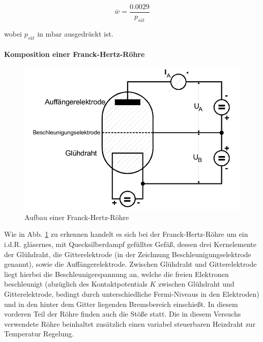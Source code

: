 \begin{equation}
  \label{eqn:Weg}
  \overline{w} = \frac{0.0029}{p_{sät}}
\end{equation}

wobei $p_{sät}$ in $\si{\milli \bar}$ ausgedrückt ist.

\paragraph{Komposition einer Franck-Hertz-Röhre}
\begin{figure}
  \center
  \includegraphics[width=\textwidth]{./logos/roehre.png}
  \caption{Aufbau einer Franck-Hertz-Röhre \cite{Anleitung}}
  \label{fig:roehre}
\end{figure}

Wie in Abb. \ref{fig:roehre} zu erkennen handelt es sich bei der Franck-Hertz-Röhre um ein i.d.R. gläsernes, mit Quecksilberdampf gefülltes Gefäß, dessen drei Kernelemente der Glühdraht, die Gitterelektrode (in der Zeichnung Beschleunigungselektrode genannt), sowie die Auffängerelektrode. Zwischen Glühdraht und Gitterelektrode liegt hierbei die Beschleunigerspannung an, welche die freien Elektronen beschleunigt (abzüglich des Kontaktpotentials $K$ zwischen Glühdraht und Gitterelektrode, bedingt durch unterschiedliche Fermi-Niveaus in den Elektroden) und in den hinter dem Gitter liegenden Bremsbereich einschießt. In diesem vorderen Teil der Röhre finden auch die Stöße statt. Die in diesem Versuchs verwendete Röhre beinhaltet zusätzlich einen variabel steuerbaren Heizdraht zur Temperatur Regelung.


